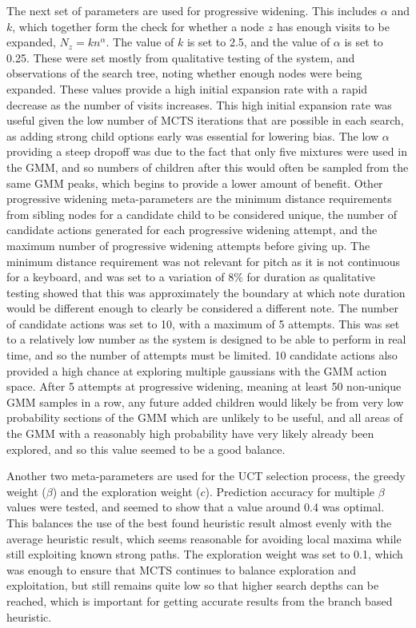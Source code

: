 The next set of parameters are used for progressive widening. This includes $\alpha$ and $k$, which together form the check for whether a node $z$ has enough visits to be expanded, $N_{z} = kn^{\alpha}$. The value of $k$ is set to 2.5, and the value of $\alpha$ is set to 0.25. These were set mostly from qualitative testing of the system, and observations of the search tree, noting whether enough nodes were being expanded. These values provide a high initial expansion rate with a rapid decrease as the number of visits increases. This high initial expansion rate was useful given the low number of MCTS iterations that are possible in each search, as adding strong child options early was essential for lowering bias. The low $\alpha$ providing a steep dropoff was due to the fact that only five mixtures were used in the GMM, and so numbers of children after this would often be sampled from the same GMM peaks, which begins to provide a lower amount of benefit. Other progressive widening meta-parameters are the minimum distance requirements from sibling nodes for a candidate child to be considered unique, the number of candidate actions generated for each progressive widening attempt, and the maximum number of progressive widening attempts before giving up. The minimum distance requirement was not relevant for pitch as it is not continuous for a keyboard, and was set to a variation of $8\%$ for duration as qualitative testing showed that this was approximately the boundary at which note duration would be different enough to clearly be considered a different note. The number of candidate actions was set to 10, with a maximum of 5 attempts. This was set to a relatively low number as the system is designed to be able to perform in real time, and so the number of attempts must be limited. 10 candidate actions also provided a high chance at exploring multiple gaussians with the GMM action space. After 5 attempts at progressive widening, meaning at least 50 non-unique GMM samples in a row, any future added children would likely be from very low probability sections of the GMM which are unlikely to be useful, and all areas of the GMM with a reasonably high probability have very likely already been explored, and so this value seemed to be a good balance.

Another two meta-parameters are used for the UCT selection process, the greedy weight ($\beta$) and the exploration weight ($c$). Prediction accuracy for multiple $\beta$ values were tested, and seemed to show that a value around 0.4 was optimal. This balances the use of the best found heuristic result almost evenly with the average heuristic result, which seems reasonable for avoiding local maxima while still exploiting known strong paths. The exploration weight was set to 0.1, which was enough to ensure that MCTS continues to balance exploration and exploitation, but still remains quite low so that higher search depths can be reached, which is important for getting accurate results from the branch based heuristic.

